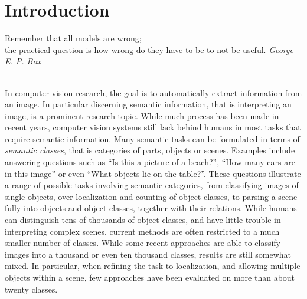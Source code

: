 \chapter{Introduction}
\vspace{1cm}
\hfill%
\begin{minipage}{.5\linewidth}
Remember that all models are wrong;\\
the practical question is how wrong do they have to be to not be useful.
\flushright%
\emph{George E. P. Box}
\end{minipage}%
\\[2cm]
In computer vision research, the goal is to automatically extract information from an image.
In particular discerning semantic information, that is interpreting an image, is a prominent
research topic.
While much process has been made in recent years, computer vision systems still lack behind
humans in most tasks that require semantic information. Many semantic tasks can be formulated
in terms of \emph{semantic classes}, that is categories of parts, objects or scenes.
Examples include answering questions such as ``Is this a picture of a beach?'', ``How many
cars are in this image'' or even ``What objects lie on the table?''.
These questions illustrate a range of possible tasks involving semantic categories,
from classifying images of single objects, over localization and counting of object classes,
to parsing a scene fully into objects and object classes, together with their relations.
%
While humans can distinguish tens of thousands of object classes, and have little trouble
in interpreting complex scenes, current methods are often restricted to a much smaller number
of classes. While some recent approaches are able to classify images into a thousand 
or even ten thousand classes, results are still somewhat mixed.
In particular, when refining the task to localization, and allowing multiple objects within
a scene, few approaches have been evaluated on more than about twenty classes.

